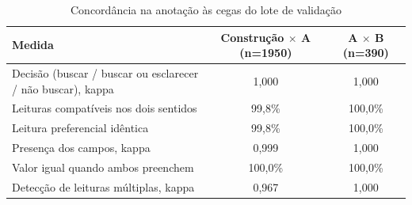 \begin{table}[htbp!]
\centering
\caption{Concordância na anotação às cegas do lote de validação}
\label{tab:lote_concordancia}
\footnotesize
\begin{tabular}{|l|c|c|}
\hline
\textbf{Medida} & \textbf{Construção $\times$ A} (n=1950) & \textbf{A $\times$ B} (n=390) \\
\hline
Decisão (buscar / buscar ou esclarecer / não buscar), kappa & 1,000 & 1,000 \\
Leituras compatíveis nos dois sentidos & 99,8\% & 100,0\% \\
Leitura preferencial idêntica & 99,8\% & 100,0\% \\
Presença dos campos, kappa & 0,999 & 1,000 \\
Valor igual quando ambos preenchem & 100,0\% & 100,0\% \\
Detecção de leituras múltiplas, kappa & 0,967 & 1,000 \\
\hline
\end{tabular}
\end{table}
